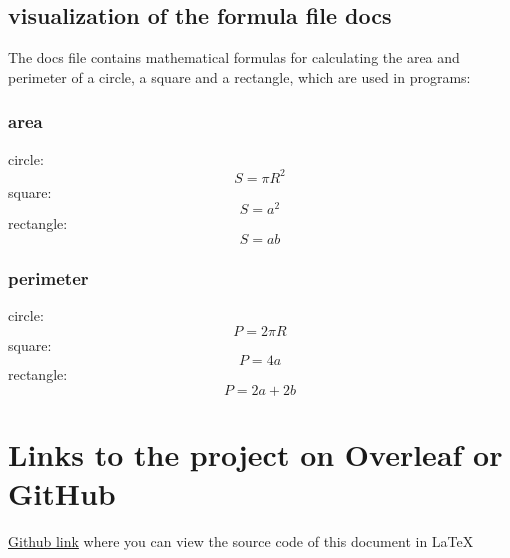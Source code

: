 \documentclass[12pt]{article}
\begin{document}
\subsection{visualization of the formula file docs}
The docs file contains mathematical formulas for calculating the area and perimeter of a circle, a square and a rectangle, which are used in programs: \\

\subsubsection{area}
circle: $$S = \pi R^{2}$$
square: $$S = a^{2}$$
rectangle: $$S = ab$$
\newpage
\subsubsection{perimeter}
circle: $$P = 2 \pi R$$
square: $$P = 4a$$
rectangle: $$P = 2a + 2b$$

\label{subsec:pythagoras}

\section{Links to the project on Overleaf or GitHub}
\href{https://github.com/ogmariar/LaTeX-1.git}{Github link} where you can view the source code of this document in LaTeX
\end{document}
